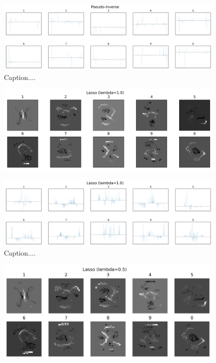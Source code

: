 \documentclass[10pt]{article}
\begin{document}
\begin{figure}[ht]
\centerline{\includegraphics[scale=0.5]{figures/bar_plot_loadings_pinv.png}}
\caption{Caption....}
\label{fig4b}
\end{figure}

\begin{figure}[ht]
\centerline{\includegraphics[scale=0.8]{figures/weight_matrix_lasso_1.png}}
\label{fig5a}
\end{figure}

\begin{figure}[ht]
\centerline{\includegraphics[scale=0.5]{figures/bar_plot_loadings_lasso_1.png}}
\caption{Caption....}
\label{fig5b}
\end{figure}

\begin{figure}[ht]
\centerline{\includegraphics[scale=0.8]{figures/weight_matrix_lasso_05.png}}
\label{fig6a}
\end{figure}
\end{document}
